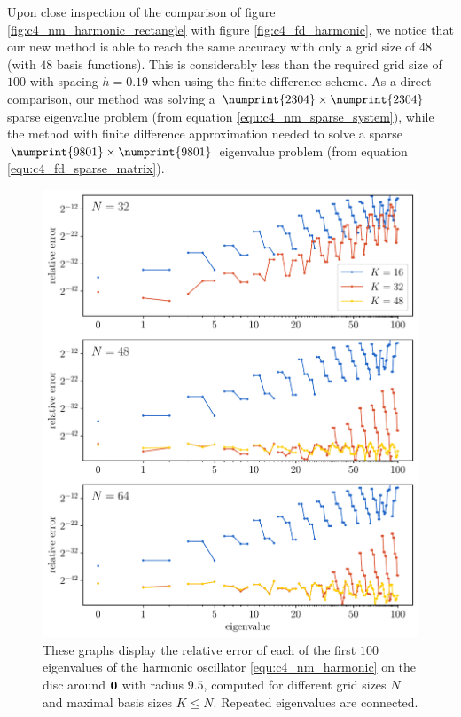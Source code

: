 Upon close inspection of the comparison of figure \ref{fig:c4_nm_harmonic_rectangle} with figure \ref{fig:c4_fd_harmonic}, we notice that our new method is able to reach the same accuracy with only a grid size of $48$ (with $48$ basis functions). This is considerably less than the required grid size of $100$ with spacing $h = 0.19$ when using the finite difference scheme. As a direct comparison, our method was solving a $\numprint{2304}\times\numprint{2304}$ sparse eigenvalue problem (from equation \ref{equ:c4_nm_sparse_system}), while the method with finite difference approximation needed to solve a sparse $\numprint{9801}\times\numprint{9801}$ eigenvalue problem (from equation \ref{equ:c4_fd_sparse_matrix}).

\begin{figure}
    \begin{center}
        \includegraphics[width=\textwidth]{img/chapter4/nm_test_harmonic_disc.pdf}
    \end{center}
    \caption{These graphs display the relative error of each of the first $100$ eigenvalues of the harmonic oscillator \eqref{equ:c4_nm_harmonic} on the disc around $\vb{0}$ with radius $9.5$, computed for different grid sizes $N$ and maximal basis sizes $K \leq N$. Repeated eigenvalues are connected.}
    \label{fig:c4_nm_harmonic_disc}
\end{figure}

